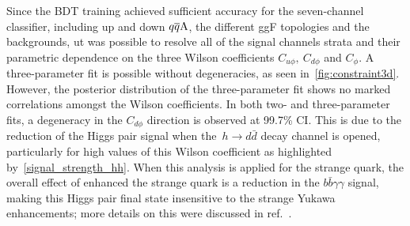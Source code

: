 Since the BDT training achieved sufficient accuracy for the seven-channel classifier, including up and down $q\overline q \rm A$, the different ggF topologies and the backgrounds, ut was possible to resolve all of the signal channels strata and their parametric dependence on the three Wilson coefficients $C_{u\phi},\ C_{d \phi}$ and $C_\phi$. A three-parameter fit is possible without degeneracies, as seen in~\autoref{fig:constraint3d}.  However, the posterior distribution of the three-parameter fit shows no marked correlations amongst the Wilson coefficients. In both two- and three-parameter fits, a degeneracy in the $C_{d\phi}$ direction is observed at 99.7\% CI. This is due to the reduction of the Higgs pair signal when the~$ h \to d \bar d$ decay channel is opened, particularly for high values of this Wilson coefficient as highlighted by~\autoref{signal_strength_hh}. When this analysis is applied for the strange quark, the overall effect of enhanced the strange quark is a reduction in the $ b \bar b \gamma \gamma$ signal, making this Higgs pair final state insensitive to the strange Yukawa enhancements; more details on this were discussed in ref.~\cite{Alasfar:2019pmn}. 
